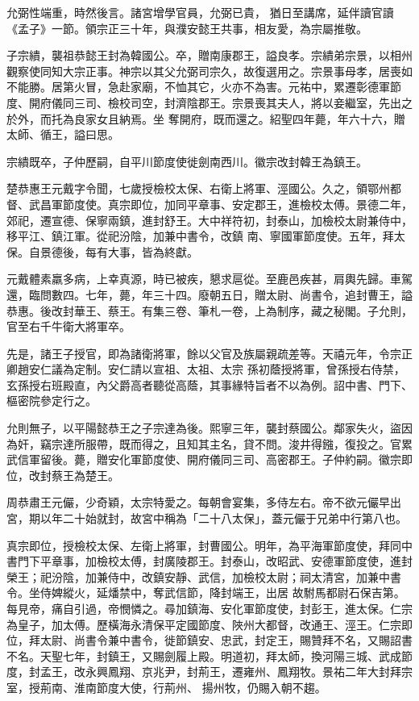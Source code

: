 \begin{pinyinscope}
 允弼性端重，時然後言。諸宮增學官員，允弼已貴，
 猶日至講席，延伴讀官讀《孟子》一節。領宗正三十年，與濮安懿王共事，相友愛，為宗屬推敬。



 子宗繢，襲祖恭懿王封為韓國公。卒，贈南康郡王，謚良孝。宗繢弟宗景，以相州觀察使同知大宗正事。神宗以其父允弼司宗久，故復選用之。宗景事母孝，居喪如不能勝。居第火冒，急赴家廟，不恤其它，火亦不為害。元祐中，累遷彰德軍節度、開府儀同三司、檢校司空，封濟陰郡王。宗景喪其夫人，將以妾繼室，先出之於外，而托為良家女且納焉。坐
 奪開府，既而還之。紹聖四年薨，年六十六，贈太師、循王，謚曰思。



 宗繢既卒，子仲歷嗣，自平川節度使徙劍南西川。徽宗改封韓王為鎮王。



 楚恭惠王元戴字令聞，七歲授檢校太保、右衛上將軍、涇國公。久之，領鄂州都督、武昌軍節度使。真宗即位，加同平章事、安定郡王，進檢校太傅。景德二年，郊祀，遷宣德、保寧兩鎮，進封舒王。大中祥符初，封泰山，加檢校太尉兼侍中，移平江、鎮江軍。從祀汾陰，加兼中書令，改鎮
 南、寧國軍節度使。五年，拜太保。自景德後，每有大事，皆為終獻。



 元戴體素羸多病，上幸真源，時已被疾，懇求扈從。至鹿邑疾甚，肩輿先歸。車駕還，臨問數四。七年，薨，年三十四。廢朝五日，贈太尉、尚書令，追封曹王，謚恭惠。後改封華王、蔡王。有集三卷、筆札一卷，上為制序，藏之秘閣。子允則，官至右千牛衛大將軍卒。



 先是，諸王子授官，即為諸衛將軍，餘以父官及族屬親疏差等。天禧元年，令宗正卿趙安仁議為定制。安仁請以宣祖、太祖、太宗
 孫初蔭授將軍，曾孫授右侍禁，玄孫授右班殿直，內父爵高者聽從高蔭，其事緣特旨者不以為例。詔中書、門下、樞密院參定行之。



 允則無子，以平陽懿恭王之子宗達為後。熙寧三年，襲封蔡國公。鄰家失火，盜因為奸，竊宗達所服帶，既而得之，且知其主名，貸不問。浚井得鏹，復投之。官累武信軍留後。薨，贈安化軍節度使、開府儀同三司、高密郡王。子仲約嗣。徽宗即位，改封蔡王為楚王。



 周恭肅王元儼，少奇穎，太宗特愛之。每朝會宴集，多侍左右。帝不欲元儼早出宮，期以年二十始就封，故宮中稱為「二十八太保」，蓋元儼于兄弟中行第八也。



 真宗即位，授檢校太保、左衛上將軍，封曹國公。明年，為平海軍節度使，拜同中書門下平章事，加檢校太傅，封廣陵郡王。封泰山，改昭武、安德軍節度使，進封榮王；祀汾陰，加兼侍中，改鎮安靜、武信，加檢校太尉；祠太清宮，加兼中書令。坐侍婢縱火，延燔禁中，奪武信節，降封端王，出居
 故駙馬都尉石保吉第。每見帝，痛自引過，帝憫憐之。尋加鎮海、安化軍節度使，封彭王，進太保。仁宗為皇子，加太傅。歷橫海永清保平定國節度、陜州大都督，改通王、涇王。仁宗即位，拜太尉、尚書令兼中書令，徙節鎮安、忠武，封定王，賜贊拜不名，又賜詔書不名。天聖七年，封鎮王，又賜劍履上殿。明道初，拜太師，換河陽三城、武成節度，封孟王，改永興鳳翔、京兆尹，封荊王，遷雍州、鳳翔牧。景祐二年大封拜宗室，授荊南、淮南節度大使，行荊州、
 揚州牧，仍賜入朝不趨。




\end{pinyinscope}
